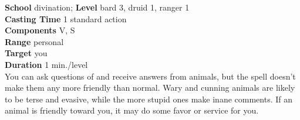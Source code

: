 \textbf{School} divination; \textbf{Level} bard 3, druid 1, ranger 1\\
\textbf{Casting Time} 1 standard action\\
\textbf{Components} V, S\\
\textbf{Range} personal\\
\textbf{Target} you\\
\textbf{Duration} 1 min./level\\
You can ask questions of and receive answers from animals, but the spell doesn't make them any more friendly than normal. Wary and cunning animals are likely to be terse and evasive, while the more stupid ones make inane comments. If an animal is friendly toward you, it may do some favor or service for you.\\
